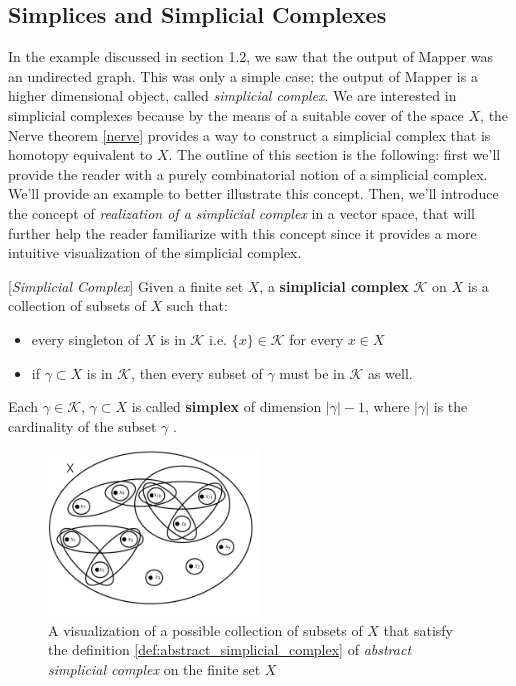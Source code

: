 \subsection{Simplices and Simplicial Complexes}\label{sec:Simplices and Simplicial Complexes}
In the example discussed in section 1.2, we saw that the output of Mapper was an undirected graph. This was only a simple case; the output of Mapper is a higher dimensional object, called \textit{simplicial complex}. We are interested in simplicial complexes because by the means of a suitable cover of the space $X$, the Nerve theorem \ref{nerve} provides a way to construct a simplicial complex that is homotopy equivalent to $X$. The outline of this section is the following: first we'll provide the reader with a purely combinatorial notion of a simplicial complex.  We'll provide an example to better illustrate this concept. Then, we'll introduce the concept of \textit{realization of a simplicial complex} in a vector space, that will further help the reader familiarize with this concept since it provides a more intuitive visualization of the simplicial complex. 

\begin{definition}{[\textit{Simplicial Complex}]}
	Given a finite set $X$, a \textbf{ simplicial complex} $\mathcal{K}$ on $X$ is a collection of subsets of $X$ such that:
	\begin{itemize}
		\item every singleton of $X$ is in $\mathcal{K}$ i.e. $\{x\} \in \mathcal{K}$ for every $x \in X$
		\item if $\gamma \subset X$ is in $\mathcal{K}$, then every subset of $\gamma$ must be in $\mathcal{K}$ as well.
	\end{itemize}
	Each $\gamma \in \mathcal{K}$, $\gamma \subset X$   is called \textbf{simplex} of dimension $|\gamma|-1$, where $|\gamma|$ is the cardinality of the subset $\gamma$ .
	\label{def:abstract_simplicial_complex}
\end{definition}

\begin{figure}[htbp!] 
	\centering    
	\includegraphics[width=0.5\textwidth]{abstract_simplicial_complex.png}
	\caption{A visualization of a possible collection of subsets of $X$ that satisfy the definition \ref{def:abstract_simplicial_complex} of \textit{abstract simplicial complex} on the finite set $X$ }
	\label{fig:abstract_simplicial_complex}
\end{figure}

